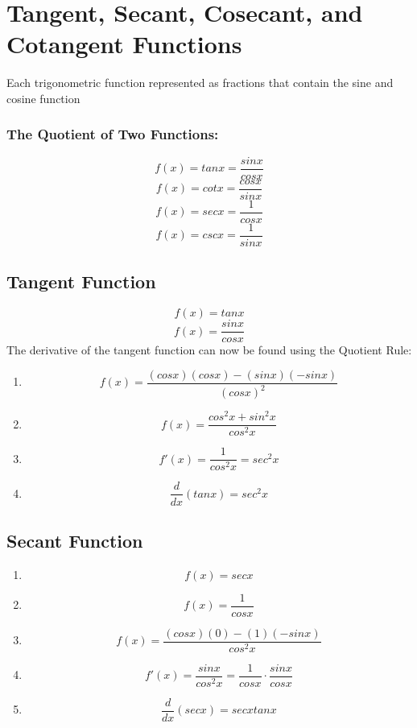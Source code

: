\documentclass[a4paper,11pt]{book}
\begin{document}
\section{Tangent, Secant, Cosecant, and Cotangent Functions}
Each trigonometric function represented as fractions that contain the sine and cosine function

\subsubsection{The Quotient  of Two Functions:}
\LARGE 
\[ f(x) = tan x = \frac{sin x}{cos x} \]
\[ f(x) = cot x = \frac{cos x}{sin x} \]
\[ f(x) = sec x = \frac{1}{cos x} \]
\[ f(x) = csc x = \frac{1}{sin x} \]
\normalsize 











\subsection{Tangent Function}
\LARGE 
\[ f(x) = tanx \]
\[ f(x) = \frac{sinx}{cosx} \]
\normalsize 
The derivative of the tangent function can now be found using the Quotient Rule:
\LARGE 
\begin{enumerate}
  \item \[ f(x) = \frac{(cosx)(cosx)-(sinx)(-sinx)}{(cosx)^2} \]
  \item \[ f(x) = \frac{cos^2x + sin^2x}{cos^2x} \]
  \item \[ f'(x) = \frac{1}{cos^2x} = sec^2x \]
  \item \[ \frac{d}{dx}(tanx) = sec^2x \]
\end{enumerate}

\normalsize 











\subsection{Secant Function}
\LARGE 
\begin{enumerate}
  \item \[ f(x) = secx \]
  \item \[ f(x) = \frac{1}{cosx} \]
  \item \[ f(x) = \frac{(cosx)(0)-(1)(-sinx)}{cos^2x} \]
  \item \[ f'(x) = \frac{sinx}{cos^2x} = \frac{1}{cosx}\cdot \frac{sinx}{cosx} \]
  \item \[ \frac{d}{dx}(secx) = secxtanx \]
\end{enumerate}
\end{document}
